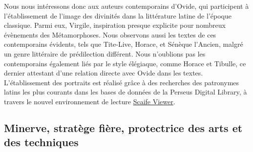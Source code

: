 \documentclass[
  letterpaper,
  DIV=11,
  numbers=noendperiod]{scrreprt}
\begin{document}
Nous nous intéressons donc aux auteurs contemporains d'Ovide, qui
participent à l'établissement de l'image des divinités dans la
littérature latine de l'époque classique. Parmi eux, Virgile,
inspiration presque explicite pour nombreux évènements des
Métamorphoses. Nous observons aussi les textes de ces contemporains
évidents, tels que Tite-Live, Horace, et Sénèque l'Ancien, malgré un
genre littéraire de prédilection différent. Nous n'oublions pas les
contemporains également liés par le style élégiaque, comme Horace et
Tibulle, ce dernier attestant d'une relation directe avec Ovide dans les
textes. L'établissement des portraits est réalisé grâce à des recherches
des patronymes latins les plus courants dans les bases de données de la
Perseus Digital Library, à travers le nouvel environnement de lecture
\href{https://scaife.perseus.org/}{Scaife Viewer}.

\subsection{Minerve, stratège fière, protectrice des arts et des
techniques}\label{minerve-stratuxe8ge-fiuxe8re-protectrice-des-arts-et-des-techniques}
\end{document}
